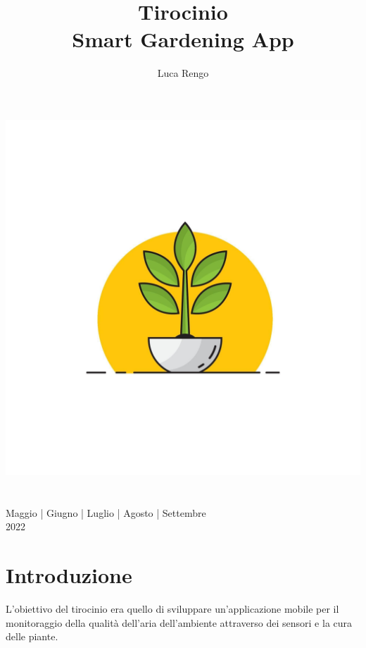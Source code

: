 \documentclass[a4paper,12pt]{report}
\title{\textbf{Tirocinio} \\[1.5ex] Smart Gardening App}
\author{Luca Rengo}
\begin{document}
	
\makeatletter
\begin{titlepage}
	\begin{center}
		\includegraphics[width=0.7\linewidth]{images/logo/plant-icon.png}\\
		{\Huge  \@title }\\[3ex] 
		{\large  \@author}\\[3ex] 
		{\large Maggio | Giugno | Luglio | Agosto | Settembre}\\[3ex]
		{\large 2022}\\[3ex]
	\end{center}
\end{titlepage}
\makeatother
\thispagestyle{empty}
\newpage
	

\tableofcontents

\newpage


	
	
\section{Introduzione}

\textsf{\small L'obiettivo del tirocinio era quello di sviluppare un'applicazione mobile per il monitoraggio della qualità dell'aria dell'ambiente attraverso dei sensori e la cura delle piante.}
\end{document}
